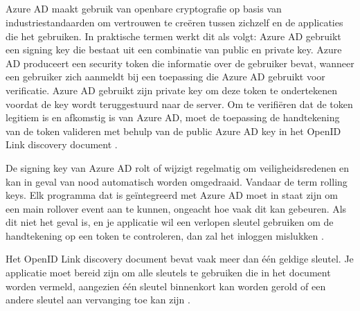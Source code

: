 \subsection{}
Azure AD maakt gebruik van openbare cryptografie op basis van industriestandaarden om vertrouwen te creëren tussen zichzelf en de applicaties die het gebruiken. In praktische termen werkt dit als volgt: Azure AD gebruikt een signing key die bestaat uit een combinatie van public en private key. Azure AD produceert een security token die informatie over de gebruiker bevat, wanneer een gebruiker zich aanmeldt bij een toepassing die Azure AD gebruikt voor verificatie. Azure AD gebruikt zijn private key om deze token te ondertekenen voordat de key wordt teruggestuurd naar de server. Om te verifiëren dat de token legitiem is en afkomstig is van Azure AD, moet de toepassing de handtekening van de token valideren met behulp van de public Azure AD key in het OpenID Link discovery document  \autocite{Boucher2019} \autocite{msaburnley2019}.

De signing key van Azure AD rolt of wijzigt regelmatig om veiligheidsredenen en kan in geval van nood automatisch worden omgedraaid. Vandaar de term rolling keys. Elk programma dat is geïntegreerd met Azure AD moet in staat zijn om een main rollover event aan te kunnen, ongeacht hoe vaak dit kan gebeuren. Als dit niet het geval is, en je applicatie wil een verlopen sleutel gebruiken om de handtekening op een token te controleren, dan zal het inloggen mislukken  \autocite{Boucher2019} \autocite{msaburnley2019} \autocite{rwike772018}.

Het OpenID Link discovery document bevat vaak meer dan één geldige sleutel. Je applicatie moet bereid zijn om alle sleutels te gebruiken die in het document worden vermeld, aangezien één sleutel binnenkort kan worden gerold of een andere sleutel aan vervanging toe kan zijn  \autocite{Boucher2019} \autocite{msaburnley2019}.
